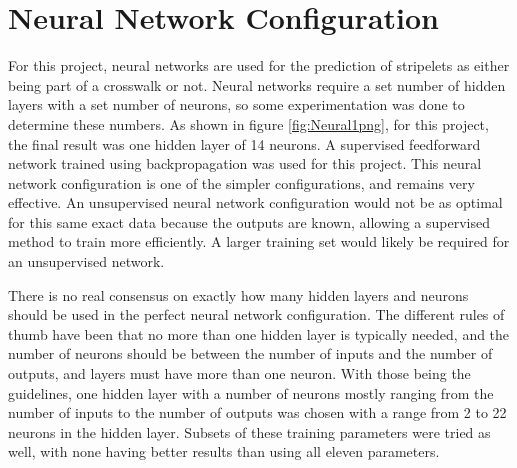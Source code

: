 \section{Neural Network Configuration}
For this project, neural networks are used for the prediction of stripelets as either being part of a crosswalk or not. Neural networks require a set number of hidden layers with a set number of neurons, so some experimentation was done to determine these numbers. As shown in figure \ref{fig:Neural1png}, for this project, the final result was one hidden layer of 14 neurons. A supervised feedforward network trained using backpropagation was used for this project. This neural network configuration is one of the simpler configurations, and remains very effective. An unsupervised neural network configuration would not be as optimal for this same exact data because the outputs are known, allowing a supervised method to train more efficiently. A larger training set would likely be required for an unsupervised network. 

 

There is no real consensus on exactly how many hidden layers and neurons should be used in the perfect neural network configuration. The different rules of thumb have been that no more than one hidden layer is typically needed, and the number of neurons should be between the number of inputs and the number of outputs, and layers must have more than one neuron\cite{Heaton:2008:INN:1502373}. With those being the guidelines, one hidden layer with a number of neurons mostly ranging from the number of inputs to the number of outputs was chosen with a range from 2 to 22 neurons in the hidden layer. Subsets of these training parameters were tried as well, with none having better results than using all eleven parameters. 

